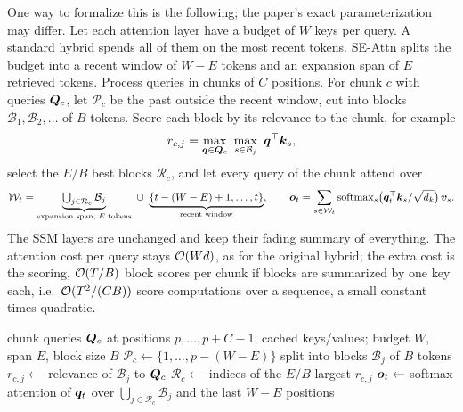 One way to formalize this is the following; the paper's exact parameterization may differ. Let
each attention layer have a budget of $W$ keys per query. A standard hybrid spends all of them on
the most recent tokens. SE-Attn splits the budget into a recent window of $W-E$ tokens and an
expansion span of $E$ retrieved tokens. Process queries in chunks of $C$ positions. For chunk
$c$ with queries $\bm{Q}_c$, let $\mathcal{P}_c$ be the past outside the recent window, cut into
blocks $\mathcal{B}_1,\mathcal{B}_2,\dots$ of $B$ tokens. Score each block by its relevance to the
chunk, for example
\begin{equation}\label{eq:c12-se-score}
  r_{c,j} = \max_{\bm{q}\in\bm{Q}_c}\ \max_{s\in\mathcal{B}_j}\ \bm{q}^{\top}\bm{k}_s ,
\end{equation}
select the $E/B$ best blocks $\mathcal{R}_c$, and let every query of the chunk attend over
\begin{equation}\label{eq:c12-se-attn}
  \mathcal{W}_t = \underbrace{\textstyle\bigcup_{j\in\mathcal{R}_c}\mathcal{B}_j}_{\text{expansion span, }E\text{ tokens}}
  \ \cup\ \underbrace{\{t-(W-E)+1,\dots,t\}}_{\text{recent window}},\qquad
  \bm{o}_t = \sum_{s\in\mathcal{W}_t}\operatorname{softmax}_s\!\big(\bm{q}_t^{\top}\bm{k}_s/\sqrt{d_k}\big)\,\bm{v}_s .
\end{equation}
The SSM layers are unchanged and keep their fading summary of everything. The attention cost per
query stays $\mathcal{O}(Wd)$, as for the original hybrid; the extra cost is the scoring, $\mathcal{O}(T/B)$
block scores per chunk if blocks are summarized by one key each, i.e.\ $\mathcal{O}(T^2/(CB))$ score
computations over a sequence, a small constant times quadratic.

\begin{algorithm}[t]
\caption{Span-expanded attention for one chunk (our formalization).}
\label{alg:c12-se-attn}
\begin{algorithmic}[1]
\Require chunk queries $\bm{Q}_c$ at positions $p,\dots,p+C-1$; cached keys/values; budget $W$, span $E$, block size $B$
\State $\mathcal{P}_c \gets \{1,\dots,p-(W-E)\}$ split into blocks $\mathcal{B}_j$ of $B$ tokens
\State $r_{c,j}\gets$ relevance of $\mathcal{B}_j$ to $\bm{Q}_c$ 
\State $\mathcal{R}_c\gets$ indices of the $E/B$ largest $r_{c,j}$
  \State $\bm{o}_t\gets$ softmax attention of $\bm{q}_t$ over $\bigcup_{j\in\mathcal{R}_c}\mathcal{B}_j$ and the last $W-E$ positions \Comment{\eqref{eq:c12-se-attn}}
\EndFor
\end{algorithmic}
\end{algorithm}

